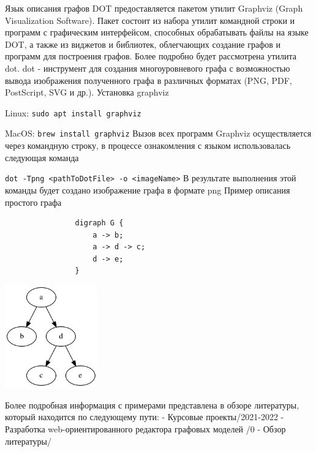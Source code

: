 \def\notedate{2021.10.05}
\def\currentauthor{Ершов В. (РК6-72Б)}

Язык описания графов DOT предоставляется пакетом утилит Graphviz (Graph Visualization Software). Пакет состоит из набора утилит командной строки и программ с графическим интерфейсом, способных обрабатывать файлы на языке DOT, а также из виджетов и библиотек, облегчающих создание графов и программ для построения графов. Более подробно будет рассмотрена утилита dot.
\newline\newline
dot - инструмент для создания многоуровневого графа с возможностью вывода изображения полученного графа в различных форматах (PNG, PDF, PostScript, SVG и др.).
\newline\newline
Установка graphviz

\quad Linux: \lstinline$sudo apt install graphviz$

\quad MacOS: \lstinline$brew install graphviz$
\newline\newline
Вызов всех программ Graphviz осуществляется через командную строку, в процессе ознакомления с языком использовалась следующая команда

\quad\lstinline$dot -Tpng <pathToDotFile> -o <imageName>$
\newline
В результате выполнения этой команды будет создано изображение графа в формате png
\newline\newline
Пример описания простого графа\newline\newline
\begin{minipage}{0.2\textwidth}
		\begin{verbatim}
				digraph G {
				    a -> b;
				    a -> d -> c;
				    d -> e;
				}
		\end{verbatim}
	\end{minipage}
	\hfill
	\begin{minipage}{0.75\textwidth}
	 	{\includegraphics[width=0.3\textwidth]{ResearchNotes/images/image4.png}\xspace}
	\end{minipage}
\newline\newline\newline
Более подробная информация с примерами представлена в обзоре литературы, который находится по следующему пути:
 - Курсовые проекты/2021-2022 - Разработка web-ориентированного редактора графовых моделей /0 - Обзор литературы/	

\noteattributes{}

